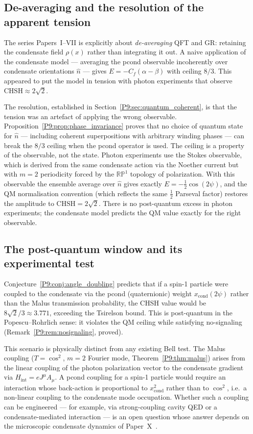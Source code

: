 \documentclass[11pt,a4paper]{article}
\theoremstyle{definition}
\theoremstyle{remark}
\newcommand{\xcond}{x_{\mathrm{cond}}}
\newcommand{\CHSH}{\mathrm{CHSH}}
\begin{document}
\subsection{De-averaging and the resolution of the apparent tension}
 
The series Papers~I--VII is explicitly about \emph{de-averaging} QFT
and GR: retaining the condensate field $\rho(x)$ rather than integrating
it out.
A naive application of the condensate model --- averaging the pcond
observable incoherently over condensate orientations $\hat{n}$ --- gives
$E=-C_f(\alpha-\beta)$ with ceiling $8/3$.
This appeared to put the model in tension with photon experiments that
observe $\CHSH\approx2\sqrt{2}$.
 
The resolution, established in Section~\ref{P9:sec:quantum_coherent}, is
that the tension was an artefact of applying the wrong observable.
Proposition~\ref{P9:prop:phase_invariance} proves that no choice of quantum
state for $\hat{n}$ --- including coherent superpositions with arbitrary
winding phases --- can break the $8/3$ ceiling when the pcond operator
is used.
The ceiling is a property of the observable, not the state.
Photon experiments use the Stokes observable, which is derived from the
same condensate action via the Noether current but with $m=2$ periodicity
forced by the $\mathbb{RP}^1$ topology of polarization.
With this observable the ensemble average over $\hat{n}$ gives exactly
$E=-\tfrac{1}{2}\cos(2\psi)$, and the QM normalisation convention
(which reflects the same $\tfrac{1}{2}$ Parseval factor) restores the
amplitude to $\CHSH=2\sqrt{2}$.
There is no post-quantum excess in photon experiments; the condensate
model predicts the QM value exactly for the right observable.
 
\subsection{The post-quantum window and its experimental test}
 
Conjecture~\ref{P9:conj:angle_doubling} predicts that if a spin-1 particle
were coupled to the condensate via the pcond (quaternionic) weight
$\xcond(2\psi)$ rather than the Malus transmission probability, the
CHSH value would be $8\sqrt{2}/3\approx3.771$, exceeding the Tsirelson
bound.
This is post-quantum in the Popescu--Rohrlich sense: it violates the QM
ceiling while satisfying no-signaling (Remark~\ref{P9:rem:nosignaling},
proved).
 
This scenario is physically distinct from any existing Bell test.
The Malus coupling ($T=\cos^2$, $m=2$ Fourier mode, Theorem~\ref{P9:thm:malus})
arises from the linear coupling of the photon polarization vector to the
condensate gradient via $H_\mathrm{int}=eJ^\mu A_\mu$.
A pcond coupling for a spin-1 particle would require an interaction
whose back-action is proportional to $\xcond^2$ rather than to
$\cos^2$, i.e.\ a non-linear coupling to the condensate mode occupation.
Whether such a coupling can be engineered --- for example, via
strong-coupling cavity QED or a condensate-mediated interaction --- is
an open question whose answer depends on the microscopic condensate
dynamics of Paper~X~\cite{Paper10}.
 
\end{document}
